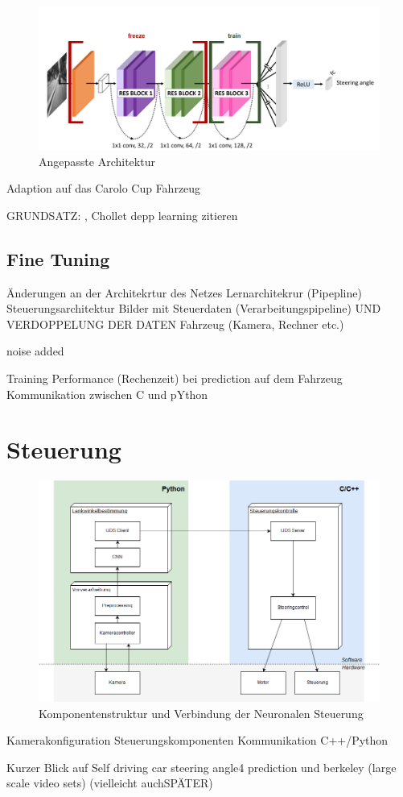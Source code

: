 \begin{figure}[h]
	\centering
	\includegraphics[scale=0.5]{figures/Architecture-DRONET-FROZEN.png}
	\caption{Angepasste Architektur}
	\label{img:dronetfrozen}
\end{figure}



Adaption auf das Carolo Cup Fahrzeug

GRUNDSATZ: , Chollet depp learning zitieren

\subsection{Fine Tuning}


Änderungen an der Architekrtur des Netzes
Lernarchitekrur (Pipepline)
Steuerungsarchitektur
Bilder mit Steuerdaten (Verarbeitungspipeline) UND VERDOPPELUNG DER DATEN
Fahrzeug (Kamera, Rechner etc.)

noise added

Training 
Performance (Rechenzeit) bei prediction auf dem Fahrzeug
Kommunikation zwischen C und pYthon


\section{Steuerung}


\begin{figure}[h]
	\centering
	\includegraphics[scale=0.46]{figures/Steuerung.png}
	\caption{Komponentenstruktur und Verbindung der Neuronalen Steuerung}
	\label{img:steuerung}
\end{figure}



Kamerakonfiguration
Steuerungskomponenten
Kommunikation C++/Python



Kurzer Blick auf  Self driving car steering angle4 prediction und berkeley (large scale video sets) (vielleicht auchSPÄTER)

